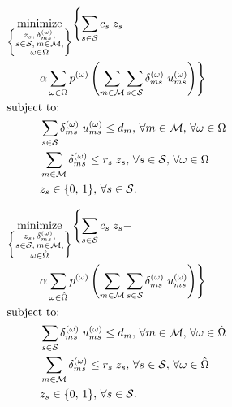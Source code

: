 \documentclass[conference]{IEEEtran}
\begin{document}
\begin{tcolorbox}[floatplacement = !ht, float, title = Problem 2 \\ Deterministic Equivalent Program (DEP)]
\begin{align}
& \underset{\left\{ \substack{
	z_s,\, \delta_{ms}^{(\omega)},\\
	s \in \mathcal{S},\, m \in \mathcal{M},\\
	\omega \in \Omega} \right\}} {\text{minimize}}
\Biggl\{ \sum_{s \in \mathcal{S}} c_s \; z_s - \nonumber \\
& \hspace{0.4in} \alpha \sum_{\omega \in \Omega} p^{(\omega)} \left( \sum_{m \in \mathcal{M}} \sum_{s \in \mathcal{S}} \delta_{ms}^{(\omega)} \; u_{ms}^{(\omega)} \right) \Biggr\} \nonumber \\
& \text{subject to:}  \nonumber \\
& \hspace{0.4in} \sum_{s \in \mathcal{S}} \delta_{ms}^{(\omega)} \; u_{ms}^{(\omega)} \leq d_m,\, \forall m \in \mathcal{M},\, \forall \omega \in \Omega \nonumber \\
& \hspace{0.4in} \sum_{m \in \mathcal{M}} \delta_{ms}^{(\omega)} \leq r_s \; z_s,\, \forall s \in \mathcal{S},\, \forall \omega \in \Omega \nonumber \\
& \hspace{0.4in} z_s \in \{0,\, 1\},\, \forall s \in \mathcal{S}. \nonumber
\end{align}
\end{tcolorbox}

\begin{tcolorbox}[floatplacement = !ht, float, title = Problem 3 \\ Sampled Deterministic Equivalent Program (sDEP)]
\begin{align}
& \underset{\left\{ \substack{
	z_s,\, \delta_{ms}^{(\omega)},\\
	s \in \mathcal{S},\, m \in \mathcal{M},\\
	\omega \in \hat{\Omega}} \right\}} {\text{minimize}}
\Biggl\{ \sum_{s \in \mathcal{S}} c_s \; z_s - \nonumber \\
& \hspace{0.4in} \alpha \sum_{\omega \in \hat{\Omega}} p^{(\omega)} \left( \sum_{m \in \mathcal{M}} \sum_{s \in \mathcal{S}} \delta_{ms}^{(\omega)} \; u_{ms}^{(\omega)} \right) \Biggr\} \nonumber \\
& \text{subject to:}  \nonumber \\
& \hspace{0.4in} \sum_{s \in \mathcal{S}} \delta_{ms}^{(\omega)} \; u_{ms}^{(\omega)} \leq d_m,\, \forall m \in \mathcal{M},\, \forall \omega \in \hat{\Omega} \nonumber \\
& \hspace{0.4in} \sum_{m \in \mathcal{M}} \delta_{ms}^{(\omega)} \leq r_s \; z_s,\, \forall s \in \mathcal{S},\, \forall \omega \in \hat{\Omega} \nonumber \\
& \hspace{0.4in} z_s \in \{0,\, 1\},\, \forall s \in \mathcal{S}. \nonumber
\end{align}
\end{tcolorbox}
\end{document}
